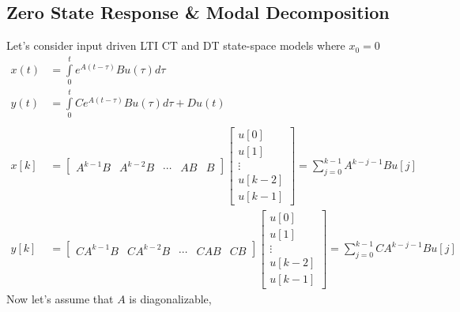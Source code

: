 \documentclass[twoside]{article}
\begin{document}
\subsection{Zero State Response \& Modal Decomposition}

Let's consider input driven LTI CT and DT state-space models where $x_0 = 0$
%
\begin{align*}
  x(t) &= \int\limits_{0}^{t} e^{A ( t - \tau ) } B u(\tau) d
                  \tau
\\
  y(t) &= \int\limits_{0}^{t} C e^{A ( t - \tau ) } B u(\tau) d
                  \tau + D u(t)
       \\ \\
  x[k]  &= \left[ \begin{array}{c|c|c|c|c} A^{k-1} B & A^{k-2} B &
         \cdots & A B & B \end{array} \right]
         \left[ \begin{array}{c}
                  u[0] \\ u[1] \\ \vdots \\ u[k-2] \\ u[k-1]
         \end{array} \right]
         = \sum\limits_{j = 0}^{k-1} A^{k-j-1} B u[j]
\\
  y[k]  &= \left[ \begin{array}{c|c|c|c|c} C A^{k-1} B & C A^{k-2} B &
         \cdots & C A B & C B \end{array} \right]
         \left[ \begin{array}{c}
                  u[0] \\ u[1] \\ \vdots \\ u[k-2] \\ u[k-1]
         \end{array} \right]
         = \sum\limits_{j = 0}^{k-1} C A^{k-j-1} B u[j]
\end{align*}
%
Now let's assume that $A$ is diagonalizable, 
%
\end{document}

